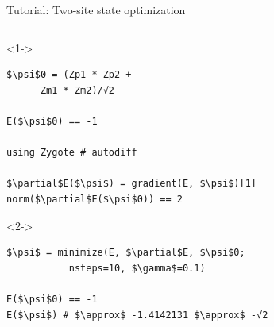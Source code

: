 \begin{frame}[fragile]{Tutorial: Two-site state optimization}

\begin{columns}

\begin{column}{5cm}

\begin{onlyenv}<1->
\begin{lstlisting}[language=JuliaLocal, style=julia, mathescape, basicstyle=\scriptsize\ttfamily]
$\psi$0 = (Zp1 * Zp2 +
      Zm1 * Zm2)/√2

E($\psi$0) == -1

using Zygote # autodiff

$\partial$E($\psi$) = gradient(E, $\psi$)[1]
norm($\partial$E($\psi$0)) == 2
\end{lstlisting}
\end{onlyenv}

\begin{onlyenv}<2->
\begin{lstlisting}[language=JuliaLocal, style=julia, mathescape, basicstyle=\scriptsize\ttfamily]
$\psi$ = minimize(E, $\partial$E, $\psi$0;
           nsteps=10, $\gamma$=0.1)

E($\psi$0) == -1
E($\psi$) # $\approx$ -1.4142131 $\approx$ -√2
 \end{lstlisting}
\end{onlyenv}

\end{column}

\begin{column}{5cm}



\end{column}
\end{columns}
\end{frame}
